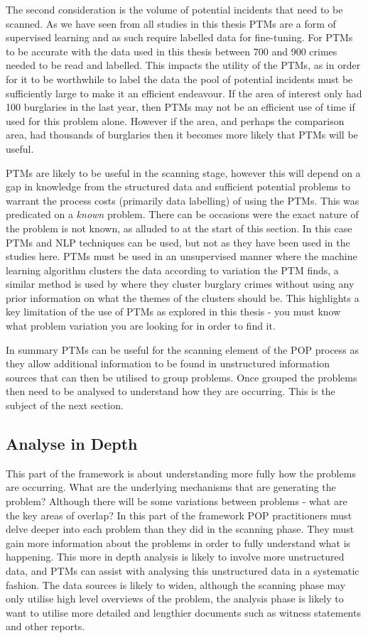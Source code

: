 The second consideration is the volume of potential incidents that need to be scanned. As we have seen from all studies in this thesis PTMs are a form of supervised learning and as such require labelled data for fine-tuning. For PTMs to be accurate with the data used in this thesis between 700 and 900 crimes needed to be read and labelled. This impacts the utility of the PTMs, as in order for it to be worthwhile to label the data the pool of potential incidents must be sufficiently large to make it an efficient endeavour. If the area of interest only had 100 burglaries in the last year, then PTMs may not be an efficient use of time if used for this problem alone. However if the area, and perhaps the comparison area, had thousands of burglaries then it becomes more likely that PTMs will be useful.

PTMs are likely to be useful in the scanning stage, however this will depend on a gap in knowledge from the structured data and sufficient potential problems to warrant the process costs (primarily data labelling) of using the PTMs.  This was predicated on a \emph{known} problem. There can be occasions were the exact nature of the problem is not known, as alluded to at the start of this section. In this case PTMs and NLP techniques can be used, but not as they have been used in the studies here. PTMs must be used in an unsupervised manner where the machine learning algorithm clusters the data according to variation the PTM finds, a similar method is used by \textcite{birks2020unsupervised} where they cluster burglary crimes without using any prior information on what the themes of the clusters should be. This highlights a key limitation of the use of PTMs as explored in this thesis - you must know what problem variation you are looking for in order to find it.

In summary PTMs can be useful for the scanning element of the POP process as they allow additional information to be found in unstructured information sources that can then be utilised to group problems. Once grouped the problems then need to be analysed to understand how they are occurring. This is the subject of the next section. 


\subsection{Analyse in Depth} This part of the framework is about understanding more fully how the problems are occurring. What are the underlying mechanisms that are generating the problem? Although there will be some variations between problems - what are the key areas of overlap? In this part of the framework POP practitioners must delve deeper into each problem than they did in the scanning phase. They must gain more information about the problems in order to fully understand what is happening. This more in depth analysis is likely to involve more unstructured data, and PTMs can assist with analysing this unstructured data  in a systematic fashion. The data sources is likely to widen, although the scanning phase may only utilise high level overviews of the problem, the analysis phase is likely to want to utilise more detailed and lengthier documents such as witness statements and other reports.   


